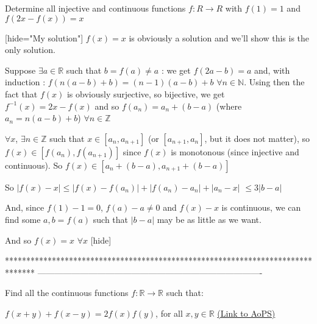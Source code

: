 \begin{solution}
	\begin{tcolorbox}Determine all injective and continuous functions $ f: R\rightarrow R$ with $ f(1) = 1$ and $ f(2x - f(x)) = x$\end{tcolorbox}

[hide="My solution"]
$ f(x) = x$ is obviously a solution and we'll show this is the only solution.

Suppose $ \exists a\in\mathbb R$ such that $ b = f(a)\neq a$ : we get $ f(2a - b) = a$ and, with induction : $ f(n(a - b) + b) = (n - 1)(a - b) + b$  $ \forall n\in \mathbb N$. Using then the fact that $ f(x)$ is obviously surjective, so bijective, we get $ f^{ - 1}(x) = 2x - f(x)$ and  so $ f(a_n) = a_n + (b - a)$ (where $ a_n = n(a - b) + b$)  $ \forall n\in \mathbb Z$

$ \forall x$, $ \exists n\in\mathbb Z$ such that $ x\in[a_n,a_{n + 1}]$ (or $ [a_{n + 1},a_n]$, but it does not matter), so $ f(x)\in[f(a_n),f(a_{n + 1})]$ since $ f(x)$ is monotonous (since injective and continuous). So $ f(x)\in[a_n + (b - a),a_{n + 1} + (b - a)]$

So $ |f(x) - x|\leq |f(x) - f(a_n)| + |f(a_n) - a_n| + |a_n - x|$ $ \leq 3|b - a|$

And, since $ f(1) - 1 = 0$, $ f(a) - a\neq 0$ and $ f(x) - x$ is continuous, we can find some $ a,b = f(a)$ such that $ |b - a|$ may be as little as we want.

And so $ f(x) = x$ $ \forall x$
[\/hide]
\end{solution}
*******************************************************************************
-------------------------------------------------------------------------------

\begin{problem}
	Find all the continuous functions $ f: \mathbb{R} \rightarrow \mathbb{R}$ such that:

$ f(x+y)+f(x-y)=2f(x)f(y)$, for all $ x,y \in \mathbb{R}$
	\flushright \href{https://artofproblemsolving.com/community/c6h262802}{(Link to AoPS)}
\end{problem}



